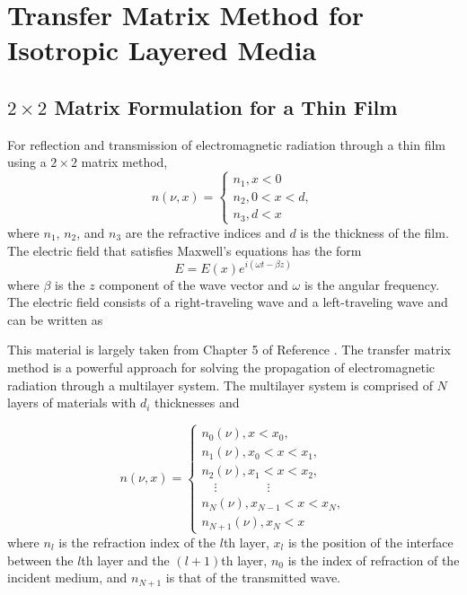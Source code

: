 \documentclass[12pt]{article}
\begin{document}
\section{Transfer Matrix Method for Isotropic Layered Media}

\subsection{$2 \times 2$ Matrix Formulation for a Thin Film}

For reflection and transmission of electromagnetic radiation through a thin film using a $2 \times 2$ matrix method, 
\begin{equation}
n(\nu, x) = \begin{cases} 
n_1, x < 0 \\
n_2, 0 < x < d, \\
n_3, d < x
\end{cases} 
\end{equation}
where $n_1$, $n_2$, and $n_3$ are the refractive indices and $d$ is the thickness of the film.  
The electric field that satisfies Maxwell's equations has the form
\begin{equation}
E = E(x) e^{i (\omega t - \beta z)}
\end{equation}
where $\beta$ is the $z$ component of the wave vector and $\omega$ is the angular frequency.  
The electric field consists of a right-traveling wave and a left-traveling wave and can be written as 
%

This material is largely taken from Chapter 5 of Reference \cite{Yeh:05}.  
The transfer matrix method is a powerful approach for solving the propagation of electromagnetic radiation through a multilayer system.  
The multilayer system is comprised of $N$ layers of materials with $d_i$ thicknesses and 

\begin{equation}
n(\nu, x) = \begin{cases} 
n_0(\nu), x < x_0, \\
n_1(\nu), x_0 < x < x_1, \\
n_2(\nu), x_1 < x < x_2 ,\\
\hspace{1em} \vdots \hspace{4em} \vdots \\
n_N(\nu), x_{N-1} < x < x_N, \\
n_{N+1}(\nu), x_N < x
\end{cases} 
\end{equation}
where $n_l$ is the refraction index of the $l$th layer, $x_l$ is the position of the interface between the $l$th layer and the $(l+1)$th layer, $n_0$ is the index of refraction of the incident medium, and $n_{N+1}$ is that of the transmitted wave.  
\end{document}
